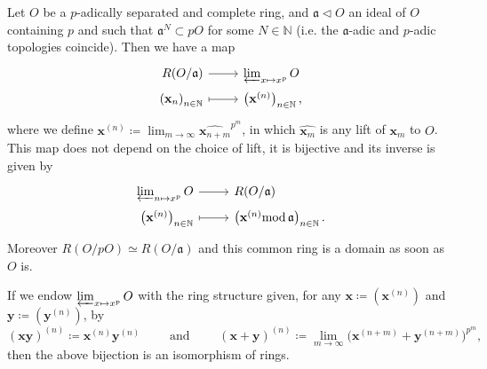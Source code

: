 \begin{prop}
	Let $O$ be a $p$-adically separated and complete ring, and $\mathfrak{a} \triangleleft O$
	an ideal of $O$ containing $p$ and such that $\mathfrak{a}^N \subset pO$ for some $N \in \mathbb{N}$
	(i.e. the $\mathfrak{a}$-adic and $p$-adic topologies coincide).
	Then we have a map
	\begin{equation*}
	\begin{tikzcd}[row sep = 0ex
		,/tikz/column 1/.append style={anchor=base east}
		,/tikz/column 2/.append style={anchor=base west}]
		R(O/\mathfrak{a}) \arrow[r, "", rightarrow] &
		\varprojlim_{x \mapsto x^p} O \\
		\left( \mathbf{x}_n \right)_{n \in \mathbb{N}} \arrow[r, "", mapsto] & 
		\left( \mathbf{x}^{(n)} \right)_{n \in \mathbb{N}}
	,\end{tikzcd}
	\end{equation*} 
	where we define $\mathbf{x}^{(n)} \coloneqq \lim_{m \to \infty} \widehat{\mathbf{x}_{n+m}}^{p^m}$,
	in which $\widehat{\mathbf{x}_m}$ is any lift of $\mathbf{x}_m$ to $O$.
	This map does not depend on the choice of lift, it is bijective
	and its inverse is given by
	\begin{equation*}
	\begin{tikzcd}[row sep = 0ex
		,/tikz/column 1/.append style={anchor=base east}
		,/tikz/column 2/.append style={anchor=base west}]
		\varprojlim_{n \mapsto x^p} O \arrow[r, "", rightarrow] &
		R(O/\mathfrak{a}) \\
		\left( \mathbf{x}^{(n)} \right)_{n \in \mathbb{N}} \arrow[r, "", mapsto] & 
		\left( \mathbf{x}^{(n)} \mathrm{mod}\, \mathfrak{a} \right)_{n \in \mathbb{N}}
	.\end{tikzcd}
	\end{equation*} 
	Moreover $R(O/pO) \simeq R(O/\mathfrak{a})$ and this common ring
	is a domain as soon as $O$ is.
\end{prop}


\begin{rem}[]\label{tiltingOperations}
	If we endow $\varprojlim_{x \mapsto x^p} O$ with the ring structure
	given, for any $\mathbf{x} \coloneqq \left( \mathbf{x}^{(n)} \right)$ and 
	$\mathbf{y} \coloneqq \left( \mathbf{y}^{(n)} \right)$, 
	by
	\begin{equation*}
		\left( \mathbf{xy} \right)^{(n)} \coloneqq \mathbf{x}^{(n)} \mathbf{y}^{(n)}
		\qquad \text{ and } \qquad
		\left( \mathbf{x} + \mathbf{y} \right)^{(n)} \coloneqq
		\lim_{m \to \infty} \big( \mathbf{x}^{(n+m)} +
		\mathbf{y}^{(n+m)}\big)^{p^m}
	,\end{equation*}
	then the above bijection is an isomorphism of rings.
\end{rem}


